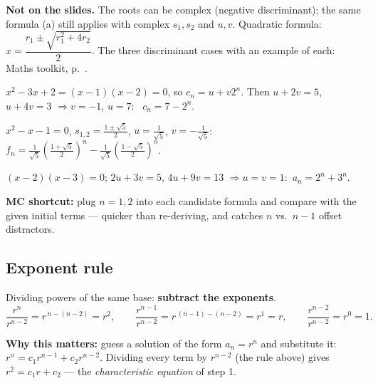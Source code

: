 \documentclass{fkt-notes}
\newcommand{\notslides}[1]{\par\noindent\textbf{Not on the slides.} #1\par}
\theoremstyle{definition}
\begin{document}
\notslides{The roots can be complex (negative discriminant); the same
  formula (a) still applies with complex $s_1,s_2$ and $u,v$. Quadratic
  formula: $x=\dfrac{r_1\pm\sqrt{r_1^2+4r_2}}{2}$. The three discriminant
  cases with an example of each: Maths toolkit, p.~\pageref{qg:quad}.}

\begin{example}[3.5 Ex.~7: $c_n=3c_{n-1}-2c_{n-2}$, $c_1=5$, $c_2=3$]
  $x^2-3x+2=(x-1)(x-2)=0$, so $c_n=u+v2^n$. Then $u+2v=5$, $u+4v=3$
  $\Rightarrow v=-1$, $u=7$: \ $c_n=7-2^n$.
\end{example}
\begin{example}[3.5 Ex.~9: Fibonacci $f_n=f_{n-1}+f_{n-2}$, $f_1=f_2=1$]
  $x^2-x-1=0$, $s_{1,2}=\frac{1\pm\sqrt5}{2}$, $u=\frac1{\sqrt5}$,
  $v=-\frac1{\sqrt5}$:\quad
  $f_n=\frac1{\sqrt5}\left(\frac{1+\sqrt5}{2}\right)^n-\frac1{\sqrt5}\left(\frac{1-\sqrt5}{2}\right)^n$.
\end{example}
\begin{example}[$a_n=5a_{n-1}-6a_{n-2}$, $a_1=5$, $a_2=13$]
  $(x-2)(x-3)=0$; $2u+3v=5$, $4u+9v=13$ $\Rightarrow u=v=1$:\ $a_n=2^n+3^n$.
\end{example}
\textbf{MC shortcut:} plug $n=1,2$ into each candidate formula and compare
with the given initial terms --- quicker than re-deriving, and catches
$n$ vs.\ $n-1$ offset distractors.
\subsection{Exponent rule}
\begin{rulepar}
  Dividing powers of the same base: \textbf{subtract the exponents}.
  \[
    \frac{r^{n}}{r^{n-2}} = r^{\,n-(n-2)} = r^{2},
    \qquad
    \frac{r^{n-1}}{r^{n-2}} = r^{\,(n-1)-(n-2)} = r^{1} = r,
    \qquad
    \frac{r^{n-2}}{r^{n-2}} = r^{0} = 1.
  \]
\end{rulepar}

\noindent \textbf{Why this matters:} guess a solution of the form
$a_n = r^n$ and substitute it:
$r^{n} = c_1 r^{n-1} + c_2 r^{n-2}$. Dividing every term by $r^{n-2}$
(the rule above) gives $r^{2} = c_1 r + c_2$ --- the
\emph{characteristic equation} of step 1.
\end{document}
